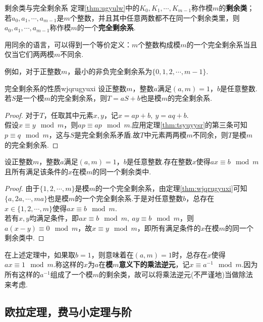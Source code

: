 \begin{definition}{剩余类与完全剩余系}
	定理\ref{thm:ugyulw}中的$K_0,K_1, \cdots ,K_{m-1}$称作模$m$的\textbf{剩余类}；若$a_0,a_1,\cdots ,a_{m-1}$是$m$个整数，并且其中任意两数都不在同一个剩余类里，则$a_0,a_1,\cdots ,a_{m-1}$称作模$m$的一个\textbf{完全剩余系}.
\end{definition}
\begin{remark}
	用同余的语言，可以得到一个等价定义：$m$个整数构成模$m$的一个完全剩余系当且仅当它们两两模$m$不同余.
\end{remark}

例如，对于正整数$m$，最小的非负完全剩余系为$\{ 0,1,2,\cdots ,m-1 \}$.

\begin{theorem}{完全剩余系的性质}{wjqrugyuxi}
	设正整数$m$，整数$a$满足$(a,m)=1$，$b$是任意整数.若$S$是一个模$m$的完全剩余系，则$T=aS+b$也是模$m$的完全剩余系.
\end{theorem}
\begin{proof}
	对于$T$，任取其中元素$x,y$，记$x=ap+b,~y=aq+b$. \\
	假设$x \equiv y \mod m$，则$ap \equiv ap \mod m$.应用定理\ref{thm:tsyuyysr}的第三条可知$p \equiv q \mod m$，这与$S$是完全剩余系矛盾.故$T$中元素两两模$m$不同余，则$T$是模$m$的完全剩余系.
\end{proof}

\begin{theorem}
	设正整数$m$，整数$a$满足$(a,m)=1$，$b$是任意整数.存在整数$x$使得$ax \equiv b \mod m$且所有满足该条件的$x$在模$m$的同一个剩余类中.
\end{theorem}
\begin{proof}
	由于$\{ 1,2,\cdots ,m \}$是模$m$的一个完全剩余系，由定理\ref{thm:wjqrugyuxi}可知$\{ a,2a,\cdots ,ma \}$也是模$m$的一个完全剩余系.于是对任意整数$b$，总存在$x \in \{ 1,2,\cdots ,m \}$使得$ax \equiv b \mod m$. \\
	若有$x,y$均满足条件，即$ax \equiv b \mod m,~ay \equiv b \mod m$，则$a(x-y) \equiv 0 \mod m$，故$x \equiv y \mod m$，即所有满足条件的$x$在模$m$的同一个剩余类中.
\end{proof}

在上述定理中，如果取$b=1$，则意味着在$(a,m)=1$时，总存在$x$使得$ax \equiv 1 \mod m$.称这样的$x$为$a$在\textbf{模$m$意义下的乘法逆元}，记$x \equiv a^{-1} \mod m$.因为所有这样的$a^{-1}$组成了一个模$m$的剩余类，故可以将乘法逆元(不严谨地)当做除法来考虑.

\subsection{欧拉定理，费马小定理与阶}

